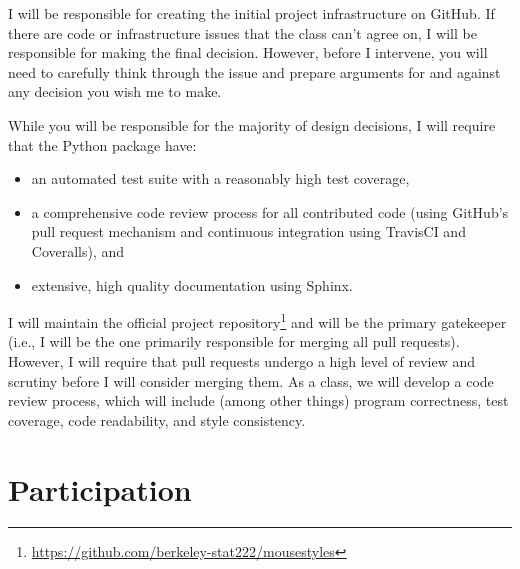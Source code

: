 \documentclass[11pt, oneside]{article}   	%
\begin{document}
I will be responsible for creating the initial project infrastructure on
GitHub.  If there are code or infrastructure issues that the class can't agree
on, I will be responsible for making the final decision.  However, before I
intervene, you will need to carefully think through the issue and prepare
arguments for and against any decision you wish me to make.

While you will be responsible for the majority of design decisions, I will
require that the Python package have:

\begin{itemize}
\item an automated test suite with a reasonably high test coverage,
\item a comprehensive code review process for all contributed code (using
   GitHub's pull request mechanism and continuous integration using
   TravisCI and Coveralls), and
\item extensive, high quality documentation using Sphinx.
\end{itemize}

I will maintain the official project
repository\footnote{\url{https://github.com/berkeley-stat222/mousestyles}}
and will be the primary gatekeeper (i.e., I will be the one primarily
responsible for merging all pull requests).  However, I will require that pull
requests undergo a high level of review and scrutiny before I will consider
merging them.  As a class, we will develop a code review process, which will
include (among other things) program correctness, test coverage, code
readability, and style consistency.

%
%
%

\section{Participation}
\end{document}

